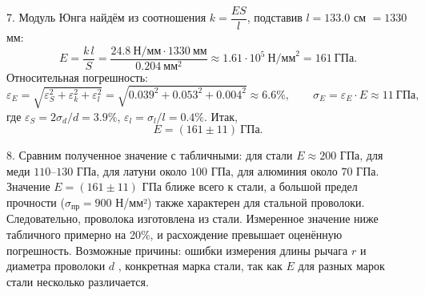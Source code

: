 \documentclass[12pt,a4paper]{article}
\begin{document}
7. Модуль Юнга найдём из соотношения $k = \dfrac{ES}{l}$, подставив $l = 133.0$ см $= 1330$ мм:
\[
    E = \frac{k\,l}{S} = \frac{24.8~\text{Н/мм}\cdot 1330~\text{мм}}{0.204~\text{мм}^2} \approx 1.61\cdot10^{5}~\text{Н/мм}^2 = 161~\text{ГПа}.
\]
Относительная погрешность:
\[
    \varepsilon_E = \sqrt{\varepsilon_S^2 + \varepsilon_k^2 + \varepsilon_l^2} = \sqrt{0.039^2 + 0.053^2 + 0.004^2} \approx 6.6\%,
    \qquad
    \sigma_E = \varepsilon_E\cdot E \approx 11~\text{ГПа},
\]
где $\varepsilon_S = 2\sigma_d/d = 3.9\%$, $\varepsilon_l = \sigma_l/l = 0.4\%$. Итак,
\[
    E = (161 \pm 11)~\text{ГПа}.
\]

8. Сравним полученное значение с табличными: для стали $E \approx 200$ ГПа, для меди $110$--$130$ ГПа, для латуни около $100$ ГПа, для алюминия около $70$ ГПа. Значение $E = (161 \pm 11)$ ГПа ближе всего к стали, а большой предел прочности ($\sigma_{\text{пр}} = 900$ Н/мм²) также характерен для стальной проволоки. Следовательно, проволока изготовлена из стали. Измеренное значение ниже табличного примерно на 20\%, 
и расхождение превышает оценённую погрешность. Возможные причины: ошибки измерения
 длины рычага $r$ и диаметра проволоки $d$ , конкретная марка стали, так как $E$ для разных марок стали несколько различается.
\end{document}
